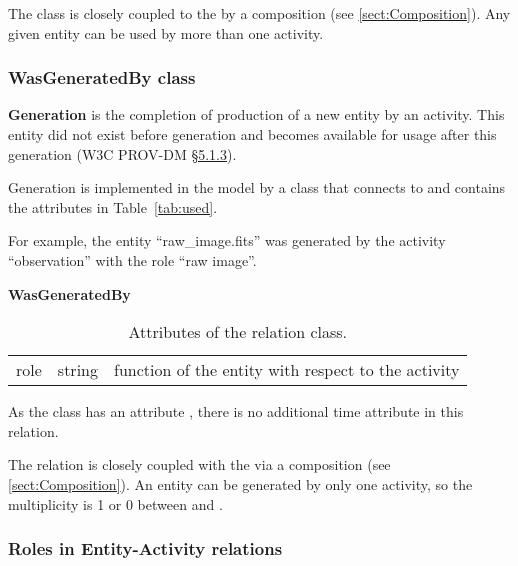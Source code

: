 The  class is closely coupled to the  by a composition (see \ref{sect:Composition}). 
Any given entity can be used by more than one activity.


\subsubsection{WasGeneratedBy class}

\textbf{Generation} is the completion of production of a new entity by an activity. This entity did not exist before generation and becomes available for usage after this generation (W3C PROV-DM \href{https://www.w3.org/TR/prov-dm/#term-Generation}{\S5.1.3}).
        
Generation is implemented in the model by a class  that connects  to  and contains the attributes in Table~\ref{tab:used}.

For example, the entity ``raw\_image.fits'' was generated by the activity ``observation'' with the role ``raw image''.

\begin{table}[ht]
\small
{}\textwidth
\textbf{\normalsize WasGeneratedBy}\vspace{0.25em}\\
\begin{tabulary}{1.0\textwidth}{llL}
\toprule
{} &  & \\
\midrule
role   &  string   &  function of the entity with respect to the activity\\
\bottomrule
\end{tabulary}
\caption[Attributes of the  relation class]{Attributes of the  relation class.}
\label{tab:wasgeneratedby}
\end{table}

As the  class has an attribute , there is no additional time attribute in this relation.

The  relation is closely coupled with the  via a composition (see \ref{sect:Composition}). 
An entity can be generated by only one activity, so the multiplicity is 1 or 0 between  and .


\subsubsection{Roles in Entity-Activity relations}
\label{sec:roles}

